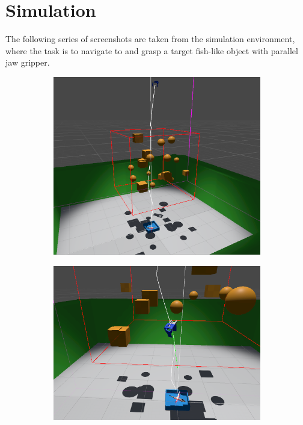 \section{Simulation}\label{app:simulation}

The following series of screenshots are taken from the simulation environment, where the task is to navigate to and grasp a target fish-like object with parallel jaw gripper.

\begin{figure}
\centering
\begin{subfigure}[t]{0.33\textwidth}
\centering
\includegraphics[width=\linewidth]{figures/simulation/editor}
\end{subfigure}%
    \hfill
\begin{subfigure}[t]{0.33\textwidth}
\centering
\includegraphics[width=\linewidth]{figures/simulation/editor-mid}

\end{subfigure}
\end{figure}
